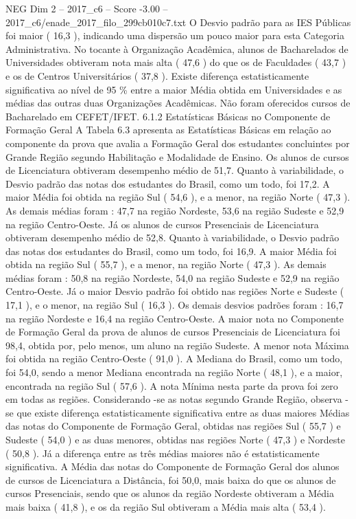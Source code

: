 \begin{textsample}{NEG Dim 2 – 2017\_c6 – Score -3.00 – 2017\_c6/enade\_2017\_filo\_299cb010c7.txt}
O Desvio padrão para as IES Públicas foi maior ( 16,3 ), indicando uma dispersão um pouco maior para esta Categoria Administrativa.
No tocante à Organização Acadêmica, alunos de Bacharelados de Universidades obtiveram nota mais alta ( 47,6 ) do que os de Faculdades ( 43,7 ) e os de Centros Universitários ( 37,8 ).
Existe diferença estatisticamente significativa ao nível de 95 \% entre a maior Média obtida em Universidades e as médias das outras duas Organizações Acadêmicas.
Não foram oferecidos cursos de Bacharelado em CEFET/IFET. 6.1.2 Estatísticas Básicas no Componente de Formação Geral A Tabela 6.3 apresenta as Estatísticas Básicas em relação ao componente da prova que avalia a Formação Geral dos estudantes concluintes por Grande Região segundo Habilitação e Modalidade de Ensino.
Os alunos de cursos de Licenciatura obtiveram desempenho médio de 51,7.
Quanto à variabilidade, o Desvio padrão das notas dos estudantes do Brasil, como um todo, foi 17,2.
A maior Média foi obtida na região Sul ( 54,6 ), e a menor, na região Norte ( 47,3 ).
As demais médias foram : 47,7 na região Nordeste, 53,6 na região Sudeste e 52,9 na região Centro-Oeste.
Já os alunos de cursos Presenciais de Licenciatura obtiveram desempenho médio de 52,8.
Quanto à variabilidade, o Desvio padrão das notas dos estudantes do Brasil, como um todo, foi 16,9.
A maior Média foi obtida na região Sul ( 55,7 ), e a menor, na região Norte ( 47,3 ).
As demais médias foram : 50,8 na região Nordeste, 54,0 na região Sudeste e 52,9 na região Centro-Oeste.
Já o maior Desvio padrão foi obtido nas regiões Norte e Sudeste ( 17,1 ), e o menor, na região Sul ( 16,3 ).
Os demais desvios padrões foram : 16,7 na região Nordeste e 16,4 na região Centro-Oeste.
A maior nota no Componente de Formação Geral da prova de alunos de cursos Presenciais de Licenciatura foi 98,4, obtida por, pelo menos, um aluno na região Sudeste.
A menor nota Máxima foi obtida na região Centro-Oeste ( 91,0 ).
A Mediana do Brasil, como um todo, foi 54,0, sendo a menor Mediana encontrada na região Norte ( 48,1 ), e a maior, encontrada na região Sul ( 57,6 ).
A nota Mínima nesta parte da prova foi zero em todas as regiões.
Considerando -se as notas segundo Grande Região, observa -se que existe diferença estatisticamente significativa entre as duas maiores Médias das notas do Componente de Formação Geral, obtidas nas regiões Sul ( 55,7 ) e Sudeste ( 54,0 ) e as duas menores, obtidas nas regiões Norte ( 47,3 ) e Nordeste ( 50,8 ).
Já a diferença entre as três médias maiores não é estatisticamente significativa.
A Média das notas do Componente de Formação Geral dos alunos de cursos de Licenciatura a Distância, foi 50,0, mais baixa do que os alunos de cursos Presenciais, sendo que os alunos da região Nordeste obtiveram a Média mais baixa ( 41,8 ), e os da região Sul obtiveram a Média mais alta ( 53,4 ).

\end{textsample}
